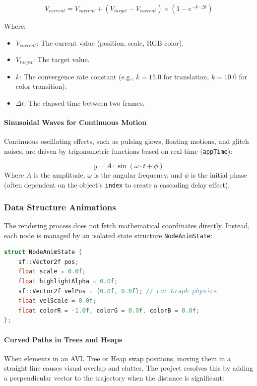 \begin{equation} 
    V_{current} = V_{current} + (V_{target} - V_{current}) \times \left(1 - e^{-k \cdot \Delta t}\right) 
\end{equation}

Where: 
\begin{itemize} 
    \item $V_{current}$: The current value (position, scale, RGB color). 
    \item $V_{target}$: The target value. 
    \item $k$: The convergence rate constant (e.g., $k = 15.0$ for translation, $k = 10.0$ for color transition). 
    \item $\Delta t$: The elapsed time between two frames. 
\end{itemize}

\paragraph{Sinusoidal Waves for Continuous Motion} 
Continuous oscillating effects, such as pulsing glows, floating motions, and glitch noises, are driven by trigonometric functions based on real-time (\texttt{appTime}):

\begin{equation} 
    y = A \cdot \sin(\omega \cdot t + \phi) 
\end{equation} 
Where $A$ is the amplitude, $\omega$ is the angular frequency, and $\phi$ is the initial phase (often dependent on the object's \texttt{index} to create a cascading delay effect).

\subsubsection{Data Structure Animations} 
The rendering process does not fetch mathematical coordinates directly. Instead, each node is managed by an isolated state structure \texttt{NodeAnimState}:

\begin{lstlisting}[language=C++, caption={Animation State Management Structure}, label={lst:node_anim}] 
struct NodeAnimState { 
    sf::Vector2f pos; 
    float scale = 0.0f; 
    float highlightAlpha = 0.0f; 
    sf::Vector2f velPos = {0.0f, 0.0f}; // For Graph physics 
    float velScale = 0.0f; 
    float colorR = -1.0f, colorG = 0.0f, colorB = 0.0f; 
}; 
\end{lstlisting}

\paragraph{Curved Paths in Trees and Heaps} 
When elements in an AVL Tree or Heap swap positions, moving them in a straight line causes visual overlap and clutter. The project resolves this by adding a perpendicular vector to the trajectory when the distance is significant:

